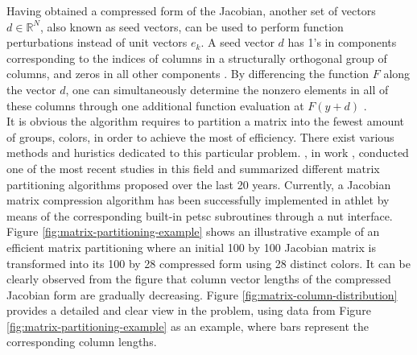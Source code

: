 

Having obtained a compressed form of the Jacobian, another set of vectors $d \in \mathbb{R}^{N}$, also known as seed vectors, can be used to perform function perturbations instead of unit vectors $e_{k}$. A seed vector $d$ has 1’s in components corresponding to the indices of columns in a structurally orthogonal group of columns, and zeros in all other components \cite{gebremedhin2005color}. By differencing the function $F$ along the vector $d$, one can simultaneously determine the nonzero elements in all of these columns through one additional function evaluation at $F(y+d)$ \cite{gebremedhin2005color}.\\


It is obvious the algorithm requires to partition a matrix into the fewest amount of groups, colors, in order to achieve the most of efficiency. There exist various methods and huristics dedicated to this particular problem. \citeauthor{gebremedhin2005color}, in work \cite{gebremedhin2005color}, conducted one of the most recent studies in this field and summarized different matrix partitioning algorithms proposed over the last 20 years. Currently, a Jacobian matrix compression algorithm has been successfully implemented in \acrshort{athlet} by means of the corresponding built-in \acrshort{petsc} subroutines through a \acrshort{nut} interface.\\


Figure \ref{fig:matrix-partitioning-example} shows an illustrative example of an efficient matrix partitioning where an initial 100 by 100 Jacobian matrix is transformed into its 100 by 28 compressed form using 28 distinct colors. It can be clearly observed from the figure that column vector lengths of the compressed Jacobian form are gradually decreasing. Figure \ref{fig:matrix-column-distribution} provides a detailed and clear view in the problem, using data from Figure \ref{fig:matrix-partitioning-example} as an example, where bars represent the corresponding column lengths.\\


